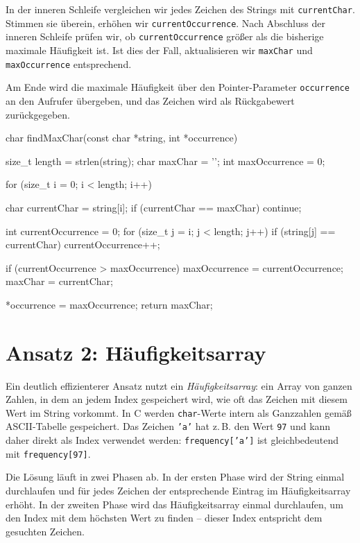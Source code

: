 In der inneren Schleife vergleichen wir jedes Zeichen des Strings mit
\texttt{currentChar}. Stimmen sie überein, erhöhen wir
\texttt{currentOccurrence}. Nach Abschluss der inneren Schleife prüfen
wir, ob \texttt{currentOccurrence} größer als die bisherige maximale
Häufigkeit ist. Ist dies der Fall, aktualisieren wir \texttt{maxChar} und
\texttt{maxOccurrence} entsprechend.

Am Ende wird die maximale Häufigkeit über den Pointer-Parameter
\texttt{occurrence} an den Aufrufer übergeben, und das Zeichen wird als
Rückgabewert zurückgegeben.

\begin{codebox}[lang=c, fontsize=\small]
char findMaxChar(const char *string, int *occurrence) {
    size_t length = strlen(string);
    char maxChar = '\0';
    int maxOccurrence = 0;

    for (size_t i = 0; i < length; i++) {
        char currentChar = string[i];
        if (currentChar == maxChar) {
            continue;
        }

        int currentOccurrence = 0;
        for (size_t j = i; j < length; j++) {
            if (string[j] == currentChar) {
                currentOccurrence++;
            }
        }

        if (currentOccurrence > maxOccurrence) {
            maxOccurrence = currentOccurrence;
            maxChar = currentChar;
        }
    }

    *occurrence = maxOccurrence;
    return maxChar;
}
\end{codebox}

\section*{Ansatz 2: Häufigkeitsarray}

Ein deutlich effizienterer Ansatz nutzt ein \textit{Häufigkeitsarray}: ein Array
von ganzen Zahlen, in dem an jedem Index gespeichert wird, wie oft das Zeichen
mit diesem Wert im String vorkommt. In C werden \texttt{char}-Werte
intern als Ganzzahlen gemäß ASCII-Tabelle gespeichert. Das Zeichen
\texttt{'a'} hat z.\,B. den Wert \texttt{97} und kann daher direkt als
Index verwendet werden: \texttt{frequency['a']} ist gleichbedeutend mit
\texttt{frequency[97]}.

Die Lösung läuft in zwei Phasen ab. In der ersten Phase wird der String einmal
durchlaufen und für jedes Zeichen der entsprechende Eintrag im Häufigkeitsarray
erhöht. In der zweiten Phase wird das Häufigkeitsarray einmal durchlaufen, um
den Index mit dem höchsten Wert zu finden -- dieser Index entspricht dem
gesuchten Zeichen.

